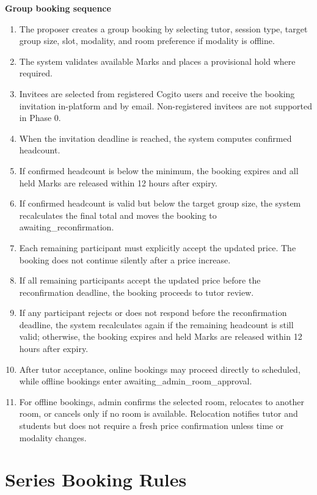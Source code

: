 \documentclass[11pt,a4paper]{article}
\begin{document}
\textbf{Group booking sequence}
\begin{enumerate}
    \item The proposer creates a group booking by selecting tutor, session type, target group size, slot, modality, and room preference if modality is offline.
    \item The system validates available Marks and places a provisional hold where required.
    \item Invitees are selected from registered Cogito users and receive the booking invitation in-platform and by email. Non-registered invitees are not supported in Phase 0.
    \item When the invitation deadline is reached, the system computes confirmed headcount.
    \item If confirmed headcount is below the minimum, the booking expires and all held Marks are released within 12 hours after expiry.
    \item If confirmed headcount is valid but below the target group size, the system recalculates the final total and moves the booking to awaiting\_reconfirmation.
    \item Each remaining participant must explicitly accept the updated price. The booking does not continue silently after a price increase.
    \item If all remaining participants accept the updated price before the reconfirmation deadline, the booking proceeds to tutor review.
    \item If any participant rejects or does not respond before the reconfirmation deadline, the system recalculates again if the remaining headcount is still valid; otherwise, the booking expires and held Marks are released within 12 hours after expiry.
    \item After tutor acceptance, online bookings may proceed directly to scheduled, while offline bookings enter awaiting\_admin\_room\_approval.
    \item For offline bookings, admin confirms the selected room, relocates to another room, or cancels only if no room is available. Relocation notifies tutor and students but does not require a fresh price confirmation unless time or modality changes.
\end{enumerate}

\section{Series Booking Rules}
\end{document}

